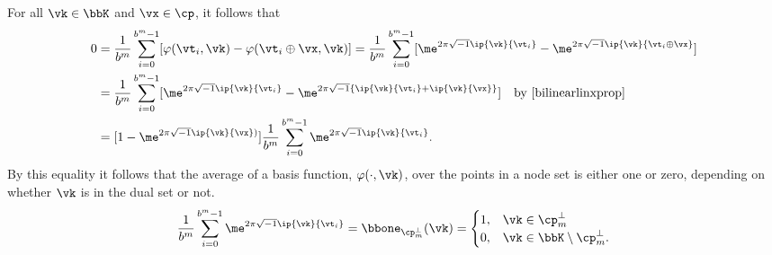 \documentclass[]{elsarticle}
\theoremstyle{definition}
\begin{document}
For all $\vk \in \bbK$ and $\vx \in \cp$, it follows that
\begin{align*}
\nonumber
0 & = \frac{1}{b^m} \sum_{i=0}^{b^m-1} [\varphi(\vt_i,\vk) - \varphi(\vt_i \oplus \vx,\vk)]
= \frac{1}{b^m} \sum_{i=0}^{b^m-1} [\me^{2 \pi \sqrt{-1} \ip{\vk}{\vt_i}} - \me^{2 \pi \sqrt{-1} \ip{\vk}{\vt_i \oplus \vx}}]\\
\nonumber
& = \frac{1}{b^m} \sum_{i=0}^{b^m-1} [\me^{2 \pi \sqrt{-1} \ip{\vk}{\vt_i}} - \me^{2 \pi \sqrt{-1} \{\ip{\vk}{\vt_i}+\ip{\vk}{\vx}\}}] \quad \text{by } \eqref{bilinearlinxprop}\\
\label{sumeq}
& = [1 - \me^{2 \pi \sqrt{-1} \ip{\vk}{\vx})}] \frac{1}{b^m} \sum_{i=0}^{b^m-1}  \me^{2 \pi \sqrt{-1} \ip{\vk}{\vt_i}}.
\end{align*}
By this equality it follows that the average of a basis function, $\varphi(\cdot,\vk)$, over the points in a node set is either one or zero, depending on whether $\vk$ is in the dual set or not.
\begin{equation*}
\frac{1}{b^m} \sum_{i=0}^{b^m-1}  \me^{2 \pi \sqrt{-1} \ip{\vk}{\vt_i}} = \bbone_{\cp_m^{\perp}}(\vk) = \begin{cases} 1 , & \vk \in \cp_m^{\perp}\\
 0,  & \vk \in \bbK \setminus \cp_m^{\perp}.
 \end{cases}
\end{equation*}
\end{document}
